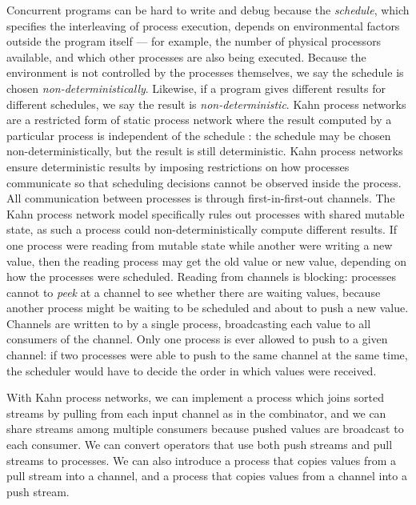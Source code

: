 Concurrent programs can be hard to write and debug because the \emph{schedule}, which specifies the interleaving of process execution, depends on environmental factors outside the program itself --- for example, the number of physical processors available, and which other processes are also being executed.
Because the environment is not controlled by the processes themselves, we say the schedule is chosen \emph{non-deterministically}.
Likewise, if a program gives different results for different schedules, we say the result is \emph{non-deterministic}.
Kahn process networks are a restricted form of static process network where the result computed by a particular process is independent of the schedule \cite{kahn1976coroutines}: the schedule may be chosen non-deterministically, but the result is still deterministic.
Kahn process networks ensure deterministic results by imposing restrictions on how processes communicate so that scheduling decisions cannot be observed inside the process.
All communication between processes is through first-in-first-out channels.
The Kahn process network model specifically rules out processes with shared mutable state, as such a process could non-deterministically compute different results.
If one process were reading from mutable state while another were writing a new value, then the reading process may get the old value or new value, depending on how the processes were scheduled.
Reading from channels is blocking: processes cannot to \emph{peek} at a channel to see whether there are waiting values, because another process might be waiting to be scheduled and about to push a new value.
Channels are written to by a single process, broadcasting each value to all consumers of the channel.
Only one process is ever allowed to push to a given channel: if two processes were able to push to the same channel at the same time, the scheduler would have to decide the order in which values were received.

With Kahn process networks, we can implement a process which joins sorted streams by pulling from each input channel as in the \Hs@join@ combinator, and we can share streams among multiple consumers because pushed values are broadcast to each consumer.
We can convert operators that use both push streams and pull streams to processes.
We can also introduce a process that copies values from a pull stream into a channel, and a process that copies values from a channel into a push stream.

